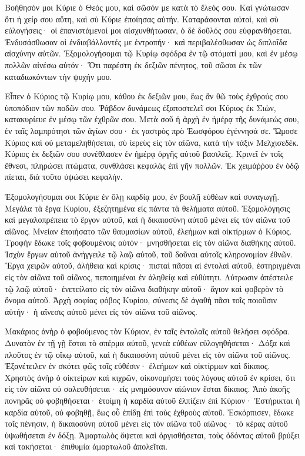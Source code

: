 \begin{spacing}{1.1}
\begin{multicols}{2}
Βοήθησόν μοι Κύριε ὁ Θεός μου, καὶ σῶσόν με κατὰ τὸ ἔλεός σου.
Καὶ γνώτωσαν ὅτι ἡ χείρ σου αὕτη, καὶ σὺ Κύριε ἐποίησας αὐτήν.
Καταράσονται αὐτοὶ, καὶ σὺ εὐλογήσεις· οἱ ἐπανιστάμενοί μοι αἰσχυνθήτωσαν, ὁ δὲ δοῦλός σου εὐφρανθήσεται.
Ἐνδυσάσθωσαν οἱ ἐνδιαβάλλοντές με ἐντροπήν· καὶ περιβαλέσθωσαν ὡς διπλοΐδα αἰσχύνην αὐτῶν.
Ἐξομολογήσομαι τῷ Κυρίῳ σφόδρα ἐν τῷ στόματί μου, καὶ ἐν μέσῳ πολλῶν αἰνέσω αὐτόν·
Ὅτι παρέστη ἐκ δεξιῶν πένητος, τοῦ σῶσαι ἐκ τῶν καταδιωκόντων τὴν ψυχήν μου.

Εἶπεν ὁ Κύριος τῷ Κυρίῳ μου, κάθου ἐκ δεξιῶν μου, ἕως ἂν θῶ τοὺς ἐχθρούς σου ὑποπόδιον τῶν ποδῶν σου.
Ῥάβδον δυνάμεως ἐξαποστελεῖ σοι Κύριος ἐκ Σιὼν, κατακυρίευε ἐν μέσῳ τῶν ἐχθρῶν σου.
Μετὰ σοῦ ἡ ἀρχὴ ἐν ἡμέρᾳ τῆς δυνάμεώς σου, ἐν ταῖς λαμπρότησι τῶν ἁγίων σου· ἐκ γαστρὸς πρὸ Ἑωσφόρου ἐγέννησά σε.
Ὤμοσε Κύριος καὶ οὐ μεταμεληθήσεται, σὺ ἱερεὺς εἰς τὸν αἰῶνα, κατὰ τὴν τάξιν Μελχισεδέκ.
Κύριος ἐκ δεξιῶν σου συνέθλασεν ἐν ἡμέρᾳ ὀργῆς αὐτοῦ βασιλεῖς.
Κρινεῖ ἐν τοῖς ἔθνεσι, πληρώσει πτώματα, συνθλάσει κεφαλὰς ἐπὶ γῆν πολλῶν.
Ἐκ χειμάῤῥου ἐν ὁδῷ πίεται, διὰ τοῦτο ὑψώσει κεφαλήν.

Ἐξομολογήσομαι σοι Κύριε ἐν ὅλῃ καρδίᾳ μου, ἐν βουλῇ εὐθέων καὶ συναγωγῇ.
Μεγάλα τὰ ἔργα Κυρίου, ἐξεζητημένα εἰς πάντα τὰ θελήματα αὐτοῦ.
Ἐξομολόγησις καὶ μεγαλοπρέπεια τὸ ἔργον αὐτοῦ, καὶ ἡ δικαιοσύνη αὐτοῦ μένει εἰς τὸν αἰῶνα τοῦ αἰῶνος.
Μνείαν ἐποιήσατο τῶν θαυμασίων αὐτοῦ, ἐλεήμων καὶ οἰκτίρμων ὁ Κύριος.
Τροφὴν ἔδωκε τοῖς φοβουμένοις αὐτόν· μνησθήσεται εἰς τὸν αἰῶνα διαθήκης αὐτοῦ.
Ἰσχὺν ἔργων αὐτοῦ ἀνήγγειλε τῷ λαῷ αὐτοῦ, τοῦ δοῦναι αὐτοῖς κληρονομίαν ἐθνῶν.
Ἔργα χειρῶν αὐτοῦ, ἀλήθεια καὶ κρίσις· πισταὶ πᾶσαι αἱ ἐντολαὶ αὐτοῦ,
ἐστηριγμέναι εἰς τὸν αἰῶνα τοῦ αἰῶνος, πεποιημέναι ἐν ἀληθείᾳ καὶ εὐθύτητι.
Λύτρωσιν ἀπέστειλε τῷ λαῷ αὐτοῦ· ἐνετείλατο εἰς τὸν αἰῶνα διαθήκην αὐτοῦ· ἅγιον καὶ φοβερὸν τὸ ὄνομα αὐτοῦ.
Ἀρχὴ σοφίας φόβος Κυρίου, σύνεσις δὲ ἀγαθὴ πᾶσι τοῖς ποιοῦσιν αὐτήν· ἡ αἴνεσις αὐτοῦ μένει εἰς τὸν αἰῶνα τοῦ αἰῶνος.

Μακάριος ἀνὴρ ὁ φοβούμενος τὸν Κύριον, ἐν ταῖς ἐντολαῖς αὐτοῦ θελήσει σφόδρα.
Δυνατὸν ἐν τῇ γῇ ἔσται τὸ σπέρμα αὐτοῦ, γενεὰ εὐθέων εὐλογηθήσεται·
Δόξα καὶ πλοῦτος ἐν τῷ οἴκῳ αὐτοῦ, καὶ ἡ δικαιοσύνη αὐτοῦ μένει εἰς τὸν αἰῶνα τοῦ αἰῶνος.
Ἐξανέτειλεν ἐν σκότει φῶς τοῖς εὐθέσιν· ἐλεήμων καὶ οἰκτίρμων καὶ δίκαιος.
Χρηστὸς ἀνὴρ ὁ οἰκτείρων καὶ κιχρῶν, οἰκονομήσει τοὺς λόγους αὐτοῦ ἐν κρίσει,
ὅτι εἰς τὸν αἰῶνα οὐ σαλευθήσεται· εἰς μνημόσυνον αἰώνιον ἔσται δίκαιος.
Ἀπὸ ἀκοῆς πονηρᾶς οὐ φοβηθήσεται· ἑτοίμη ἡ καρδία αὐτοῦ ἐλπίζειν ἐπὶ Κύριον·
Ἐστήρικται ἡ καρδία αὐτοῦ, οὐ φοβηθῇ, ἕως οὗ ἐπίδῃ ἐπὶ τοὺς ἐχθροὺς αὐτοῦ.
Ἐσκόρπισεν, ἔδωκε τοῖς πένησιν, ἡ δικαιοσύνη αὐτοῦ μένει εἰς τὸν αἰῶνα τοῦ αἰῶνος· τὸ κέρας αὐτοῦ ὑψωθήσεται ἐν δόξῃ.
Ἁμαρτωλὸς ὄψεται καὶ ὀργισθήσεται, τοὺς ὀδόντας αὐτοῦ βρύξει καὶ τακήσεται· ἐπιθυμία ἁμαρτωλοῦ ἀπολεῖται.


\end{multicols}
\end{spacing}
